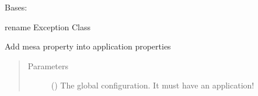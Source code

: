 \documentclass[a4paper,10pt,english]{sphinxmanual}
\begin{document}
\begin{fulllineitems}

\begin{fulllineitems}
\label{\detokenize{commands/apidoc/src:src.Path.readlink}}
\end{fulllineitems}


\begin{fulllineitems}
\label{\detokenize{commands/apidoc/src:src.Path.rm}}
\end{fulllineitems}


\begin{fulllineitems}
\label{\detokenize{commands/apidoc/src:src.Path.smartcopy}}
\end{fulllineitems}


\begin{fulllineitems}
\label{\detokenize{commands/apidoc/src:src.Path.symlink}}
\end{fulllineitems}


\end{fulllineitems}


\begin{fulllineitems}
\label{\detokenize{commands/apidoc/src:src.SatException}}
Bases: 

rename Exception Class

\end{fulllineitems}


\begin{fulllineitems}
\label{\detokenize{commands/apidoc/src:src.activate_mesa_property}}
Add mesa property into application properties
\begin{quote}\begin{description}
\item[{Parameters}] \leavevmode
{} () \textendash{} The global configuration. It must have an application!

\end{description}\end{quote}

\end{fulllineitems}
\end{document}
